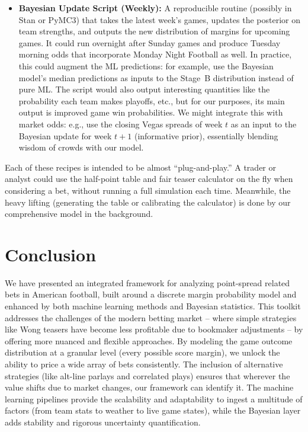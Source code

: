 \documentclass[12pt]{article}
\begin{document}
\begin{itemize}
    \item \textbf{Bayesian Update Script (Weekly):} A reproducible routine (possibly in Stan or PyMC3) that takes the latest week’s games, updates the posterior on team strengths, and outputs the new distribution of margins for upcoming games. It could run overnight after Sunday games and produce Tuesday morning odds that incorporate Monday Night Football as well. In practice, this could augment the ML predictions: for example, use the Bayesian model’s median predictions as inputs to the Stage~B distribution instead of pure ML. The script would also output interesting quantities like the probability each team makes playoffs, etc., but for our purposes, its main output is improved game win probabilities. We might integrate this with market odds: e.g., use the closing Vegas spreads of week $t$ as an input to the Bayesian update for week $t+1$ (informative prior), essentially blending wisdom of crowds with our model.
\end{itemize}

Each of these recipes is intended to be almost “plug-and-play.” A trader or analyst could use the half-point table and fair teaser calculator on the fly when considering a bet, without running a full simulation each time. Meanwhile, the heavy lifting (generating the table or calibrating the calculator) is done by our comprehensive model in the background.

\section{Conclusion}
We have presented an integrated framework for analyzing point-spread related bets in American football, built around a discrete margin probability model and enhanced by both machine learning methods and Bayesian statistics. This toolkit addresses the challenges of the modern betting market – where simple strategies like Wong teasers have become less profitable due to bookmaker adjustments – by offering more nuanced and flexible approaches. By modeling the game outcome distribution at a granular level (every possible score margin), we unlock the ability to price a wide array of bets consistently. The inclusion of alternative strategies (like alt-line parlays and correlated plays) ensures that wherever the value shifts due to market changes, our framework can identify it. The machine learning pipelines provide the scalability and adaptability to ingest a multitude of factors (from team stats to weather to live game states), while the Bayesian layer adds stability and rigorous uncertainty quantification.
\end{document}
